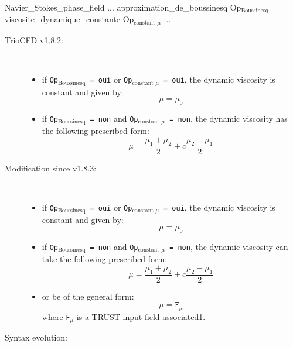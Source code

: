  \begin{minipage}[t]{\textwidth}
 \begin{inputfile}
Navier_Stokes_phase_field {
  ... 
  approximation_de_boussinesq Op$_{\text{Boussinesq}}$ 
  viscosite_dynamique_constante Op$_{\text{constant }\mu}$
  ...
}
\end{inputfile}
 \end{minipage}
\begin{description}
 \item[TrioCFD v1.8.2:] ~
 \begin{itemize}
  \item if \texttt{Op$_{\text{Boussinesq}}$ = oui} or  \texttt{Op$_{\text{constant }\mu}$ = oui}, the dynamic viscosity is constant and given by:
  \begin{equation}
   \mu = \mu_0
  \end{equation}

  \item if \texttt{Op$_{\text{Boussinesq}}$ = non} and \texttt{Op$_{\text{constant }\mu}$ = non}, the dynamic viscosity has the following prescribed form:
 \begin{equation}
  \mu = \frac{\mu_1+\mu_2}{2}+c\frac{\mu_2-\mu_1}{2}
 \end{equation}
 \end{itemize}

 \item[Modification since v1.8.3:] ~
 \begin{itemize}
  \item if \texttt{Op$_{\text{Boussinesq}}$ = oui} or  \texttt{Op$_{\text{constant }\mu}$ = oui}, the dynamic viscosity is constant and given by:
  \begin{equation}
   \mu = \mu_0
  \end{equation}

  \item if \texttt{Op$_{\text{Boussinesq}}$ = non} and \texttt{Op$_{\text{constant }\mu}$ = non}, the dynamic viscosity can take the following prescribed form:
 \begin{equation}
  \mu = \frac{\mu_1+\mu_2}{2}+c\frac{\mu_2-\mu_1}{2}
 \end{equation}

 \item or be of the general form:
 \begin{equation}
  \mu = \texttt{F}_\mu
 \end{equation}
where \texttt{F}$_\mu$ is a TRUST input field associated1. \\ 
 \end{itemize}

\item[Syntax evolution:] ~
\end{description} 
